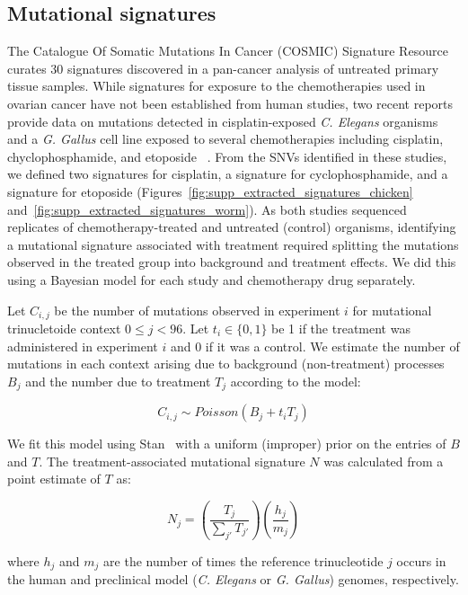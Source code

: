 \subsection*{Mutational signatures}
The Catalogue Of Somatic Mutations In Cancer (COSMIC) Signature Resource curates 30 signatures discovered in a pan-cancer analysis of untreated primary tissue samples. While signatures for exposure to the chemotherapies used in ovarian cancer have not been established from human studies, two recent reports provide data on mutations detected in cisplatin-exposed \textit{C. Elegans} organisms~\cite{Meier_2014} and a \textit{G. Gallus} cell line exposed to several chemotherapies including cisplatin, chyclophosphamide, and etoposide ~\cite{Szikriszt_2016}. From the SNVs identified in these studies, we defined two signatures for cisplatin, a signature for cyclophosphamide, and a signature for etoposide (Figures~\ref{fig:supp_extracted_signatures_chicken} and~\ref{fig:supp_extracted_signatures_worm}). As both studies sequenced replicates of chemotherapy-treated and untreated (control) organisms, identifying a mutational signature associated with treatment required splitting the mutations observed in the treated group into background and treatment effects. We did this using a Bayesian model for each study and chemotherapy drug separately.

Let $C_{i,j}$ be the number of mutations observed in experiment $i$ for mutational trinucletoide context $0 \leq j < 96$. Let $t_i \in \{0,1\}$ be 1 if the treatment was administered in experiment $i$ and 0 if it was a control. We estimate the number of mutations in each context arising due to background (non-treatment) processes $B_j$ and the number due to treatment $T_j$ according to the model:

\[
C_{i,j} \sim \mathit{Poisson}(B_j + t_i T_j)
\]

We fit this model using Stan~\cite{Gelman_2015} with a uniform (improper) prior on the entries of $B$ and $T$. The treatment-associated mutational signature $N$ was calculated from a point estimate of $T$ as:

\[
N_j = \left ( \frac{T_j}{\sum_{j'}{T_{j'}}} \right ) \left ( \frac{h_j}{m_j} \right )
\]

where $h_j$ and $m_j$ are the number of times the reference trinucleotide $j$ occurs in the human and preclinical model (\textit{C. Elegans} or \textit{G. Gallus}) genomes, respectively.


